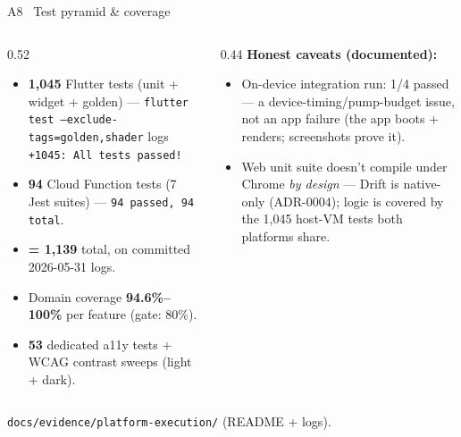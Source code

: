 \documentclass[aspectratio=169,11pt]{beamer}
\begin{document}
\begin{frame}{A8 \textperiodcentered\ Test pyramid \& coverage}
\begin{columns}[T,onlytextwidth]
  \begin{column}{0.52\textwidth}
    \begin{itemize}\footnotesize
      \item \textbf{1,045} Flutter tests (unit + widget + golden) --- \texttt{flutter test --exclude-tags=golden,shader} logs \texttt{+1045: All tests passed!}
      \item \textbf{94} Cloud Function tests (7 Jest suites) --- \texttt{94 passed, 94 total}.
      \item \textbf{= 1,139} total, on committed 2026-05-31 logs.
      \item Domain coverage \textbf{94.6\%--100\%} per feature (gate: 80\%).
      \item \textbf{53} dedicated a11y tests + WCAG contrast sweeps (light + dark).
    \end{itemize}
  \end{column}
  \begin{column}{0.44\textwidth}
    {\footnotesize\textbf{Honest caveats (documented):}}
    \begin{itemize}\footnotesize
      \item On-device integration run: 1/4 passed --- a device-timing/pump-budget issue, not an app failure (the app boots + renders; screenshots prove it).
      \item Web unit suite doesn't compile under Chrome \emph{by design} --- Drift is native-only (ADR-0004); logic is covered by the 1,045 host-VM tests both platforms share.
    \end{itemize}
  \end{column}
\end{columns}
\vfill
{\footnotesize\color{gray!70} \texttt{docs/evidence/platform-execution/} (README + logs).}
\end{frame}
\end{document}
